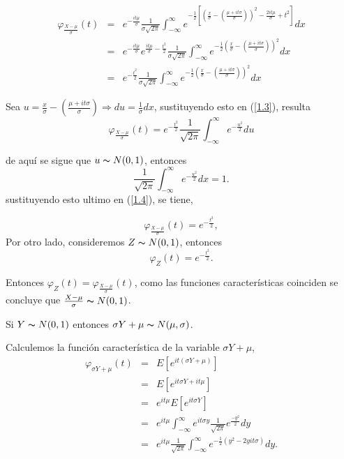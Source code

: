 \documentclass[
  letterpaper,
  DIV=11,
  numbers=noendperiod]{scrreprt}
\begin{document}
\begin{eqnarray}\label{1.3}
\varphi_{\frac{X-\mu}{\sigma}}(t) & = & e^{-\frac{it\mu}{\sigma}}\frac{1}{\sigma\sqrt{2\pi}}\int_{-\infty}^{\infty}e^{-\frac{1}{2}\left[\left(\frac{x}{\sigma}-\left(\frac{\mu+it\sigma}{\sigma}\right)\right)^{2}-\frac{2 it\mu}{\sigma}+t^{2}\right]}dx\nonumber\\
& = & e^{-\frac{it\mu}{\sigma}}e^{\frac{it\mu}{\sigma}-\frac{t^{2}}{2}}\frac{1}{\sigma\sqrt{2\pi}}\int_{-\infty}^{\infty}e^{-\frac{1}{2}\left(\frac{x}{\sigma}-\left(\frac{\mu+it\sigma}{\sigma}\right)\right)^{2}}dx\nonumber\\
& = & e^{-\frac{t^{2}}{2}}\frac{1}{\sigma\sqrt{2\pi}}\int_{-\infty}^{\infty}e^{-\frac{1}{2}\left(\frac{x}{\sigma}-\left(\frac{\mu+it\sigma}{\sigma}\right)\right)^{2}}dx
\end{eqnarray}

Sea
\(u=\frac{x}{\sigma}-\left(\frac{\mu+it\sigma}{\sigma}\right)\Longrightarrow du=\frac{1}{\sigma}dx\),
sustituyendo esto en (\ref{1.3}), resulta \begin{equation}\label{1.4}
\varphi_{\frac{X-\mu}{\sigma}}(t) = e^{-\frac{t^{2}}{2}}\frac{1}{\sqrt{2\pi}}\int_{-\infty}^{\infty}e^{-\frac{u^{2}}{2}}du
\end{equation}

de aquí se sigue que \(u\thicksim N(0,1)\), entonces \[
\frac{1}{\sqrt{2\pi}}\int_{-\infty}^{\infty}e^{-\frac{u^{2}}{2}}dx=1.
\] sustituyendo esto ultimo en (\ref{1.4}), se tiene,

\begin{equation}\label{1.5}
\varphi_{\frac{X-\mu}{\sigma}}(t) =e^{-\frac{t^{2}}{2}},
\end{equation} Por otro lado, consideremos \(Z\thicksim N(0,1)\),
entonces \begin{equation*}
\varphi_{Z}(t) =e^{-\frac{t^{2}}{2}}.
\end{equation*}

Entonces \(\varphi_{Z}(t)=\varphi_{\frac{X-\mu}{\sigma}}(t)\), como las
funciones características coinciden se concluye que
\(\frac{X-\mu}{\sigma}\thicksim N(0,1)\).

\begin{teor}
Si $Y\thicksim N(0,1)$ entonces $\sigma Y+\mu \thicksim N(\mu,\sigma)$.
\end{teor}

Calculemos la función característica de la variable \(\sigma Y+\mu\),
\begin{eqnarray}\label{2.1}
\varphi_{\sigma Y+\mu}(t) & = & E\left[e^{it(\sigma Y+\mu)}\right]\nonumber\\
& = & E\left[e^{it\sigma Y+it\mu}\right]\nonumber\\
& = & e^{it\mu}E\left[e^{it\sigma Y}\right]\nonumber\\
& = & e^{it\mu}\int_{-\infty}^{\infty}e^{it\sigma y}\frac{1}{\sqrt{2\pi}}e^{\frac{-y^{2}}{2}}dy\nonumber\\
& = & e^{it\mu}\frac{1}{\sqrt{2\pi}}\int_{-\infty}^{\infty}e^{-\frac{1}{2}(y^{2}-2yit\sigma) }dy.
\end{eqnarray}
\end{document}
